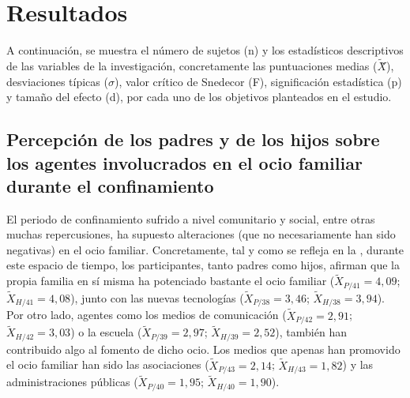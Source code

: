 \documentclass{textolivre}
\begin{document}
\section{Resultados}
A continuación, se muestra el número de sujetos (n) y los estadísticos descriptivos de las variables de la investigación, concretamente las puntuaciones medias ($\tilde{X}$̃), desviaciones típicas ($\sigma$), valor crítico de Snedecor (F), significación estadística (p) y tamaño del efecto (d), por cada uno de los objetivos planteados en el estudio.

\subsection{Percepción de los padres y de los hijos sobre los agentes involucrados en el ocio familiar durante el confinamiento}
El periodo de confinamiento sufrido a nivel comunitario y social, entre otras muchas repercusiones, ha supuesto alteraciones (que no necesariamente han sido negativas) en el ocio familiar. Concretamente, tal y como se refleja en la , durante este espacio de tiempo, los participantes, tanto padres como hijos, afirman que la propia familia en sí misma ha potenciado bastante el ocio familiar ($\tilde{X}_{P/41}=4,09$; $\tilde{X}_{H/41}=4,08$), junto con las nuevas tecnologías ($\tilde{X}_{P/38}=3,46$; $\tilde{X}_{H/38}=3,94$). Por otro lado, agentes como los medios de comunicación ($\tilde{X}_{P/42}=2,91$; $\tilde{X}_{H/42}=3,03$) o la escuela ($\tilde{X}_{P/39}=2,97$; $\tilde{X}_{H/39}=2,52$), también han contribuido algo al fomento de dicho ocio. Los medios que apenas han promovido el ocio familiar han sido las asociaciones ($\tilde{X}_{P/43}=2,14$; $\tilde{X}_{H/43}=1,82$) y las administraciones públicas ($\tilde{X}_{P/40}=1,95$; $\tilde{X}_{H/40}=1,90$). 
\end{document}
